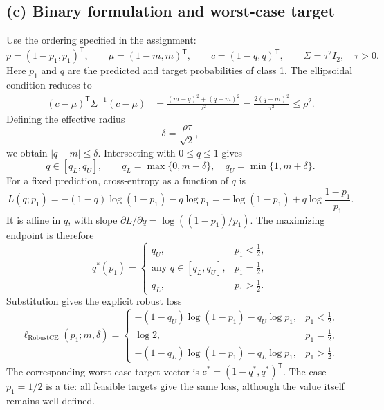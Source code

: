 \documentclass[11pt,a4paper]{article}
\newcommand{\RCE}{\mathrm{RobustCE}}
\begin{document}
\subsection*{(c) Binary formulation and worst-case target}
Use the ordering specified in the assignment:
\begin{equation}
    p=(1-p_1,p_1)^{\mathsf T},\qquad
    \mu=(1-m,m)^{\mathsf T},\qquad
    c=(1-q,q)^{\mathsf T},\qquad
    \Sigma=\tau^2 I_2,\quad\tau>0.
\end{equation}
Here $p_1$ and $q$ are the predicted and target probabilities of class 1.
The ellipsoidal condition reduces to
\begin{align}
    (c-\mu)^{\mathsf T}\Sigma^{-1}(c-\mu)
      &=\frac{(m-q)^2+(q-m)^2}{\tau^2}
       =\frac{2(q-m)^2}{\tau^2}\leq\rho^2.
\end{align}
Defining the effective radius
\begin{equation}
    \boxed{\delta=\frac{\rho\tau}{\sqrt{2}}},
\end{equation}
we obtain $|q-m|\leq\delta$. Intersecting with $0\leq q\leq1$ gives
\begin{equation}
    \boxed{q\in[q_L,q_U],\qquad
       q_L=\max\{0,m-\delta\},\quad q_U=\min\{1,m+\delta\}.}
\end{equation}
For a fixed prediction, cross-entropy as a function of $q$ is
\begin{equation}
    L(q;p_1)=-(1-q)\log(1-p_1)-q\log p_1
            =-\log(1-p_1)+q\log\frac{1-p_1}{p_1}.
\end{equation}
It is affine in $q$, with slope
$\partial L/\partial q=\log((1-p_1)/p_1)$. The maximizing endpoint is therefore
\begin{equation}
    q^*(p_1)=
    \begin{cases}
      q_U, & p_1<\tfrac12,\\
      \text{any }q\in[q_L,q_U], & p_1=\tfrac12,\\
      q_L, & p_1>\tfrac12.
    \end{cases}
\end{equation}
Substitution gives the explicit robust loss
\begin{equation}
    \boxed{\ell_{\RCE}(p_1;m,\delta)=
    \begin{cases}
    -(1-q_U)\log(1-p_1)-q_U\log p_1,&p_1<\tfrac12,\\
    \log2,&p_1=\tfrac12,\\
    -(1-q_L)\log(1-p_1)-q_L\log p_1,&p_1>\tfrac12.
    \end{cases}}
\end{equation}
The corresponding worst-case target vector is
$c^*=(1-q^*,q^*)^{\mathsf T}$. The case $p_1=1/2$ is a tie: all feasible targets
give the same loss, although the value itself remains well defined.
\end{document}
